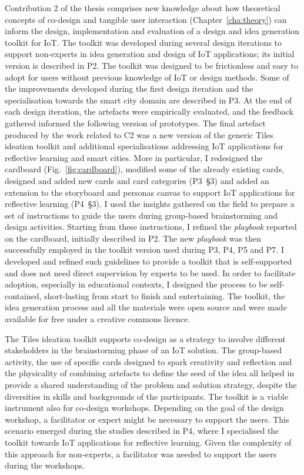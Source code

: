 Contribution 2 of the thesis comprises new knowledge about how theoretical concepts of co-design and tangible user interaction (Chapter~\ref{cha:theory}) can inform the design, implementation and evaluation of a design and idea generation toolkit for IoT. The toolkit was developed during several design iterations to support non-experts in idea generation and design of IoT applications; its initial version is described in P2. The toolkit was designed to be frictionless and easy to adopt for users without previous knowledge of IoT or design methods. Some of the improvements developed during the first design iteration and the specialisation towards the smart city domain are described in P3. At the end of each design iteration, the artefacts were empirically evaluated, and the feedback gathered informed the following version of prototypes. The final artefact produced by the work related to C2 was a new version of the generic Tiles ideation toolkit and additional specialisations addressing IoT applications for reflective learning and smart cities. More in particular, I redesigned the cardboard (Fig.~\ref{fig:cardboard}), modified some of the already existing cards, designed and added new cards and card categories (P3~\S3) and added an extension to the storyboard and personas canvas to support IoT applications for reflective learning (P4~\S3). I used the insights gathered on the field to prepare a set of instructions to guide the users during group-based brainstorming and design activities. Starting from these instructions, I refined the \textit{playbook} reported on the cardboard, initially described in P2. The new \textit{playbook} was then successfully employed in the toolkit version used during P3, P4, P5 and P7. I developed and refined such guidelines to provide a toolkit that is self-supported and does not need direct supervision by experts to be used. In order to facilitate adoption, especially in educational contexts, I designed the process to be self-contained, short-lasting from start to finish and entertaining. The toolkit, the idea generation process and all the materials were open source and were made available for free under a creative commons licence.

The Tiles ideation toolkit supports co-design as a strategy to involve different stakeholders in the brainstorming phase of an IoT solution. The group-based activity, the use of specific cards designed to spark creativity and reflection and the physicality of combining artefacts to define the seed of the idea all helped in provide a shared understanding of the problem and solution strategy, despite the diversities in skills and backgrounds of the participants. The toolkit is a viable instrument also for co-design workshops. Depending on the goal of the design workshop, a facilitator or expert might be necessary to support the users. This scenario emerged during the studies described in P4, where I specialised the toolkit towards IoT applications for reflective learning. Given the complexity of this approach for non-experts, a facilitator was needed to support the users during the workshops.

